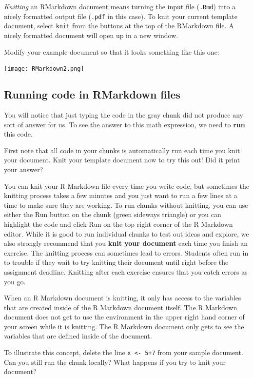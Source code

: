 \documentclass[
]{article}
\makeatletter
\newcommand*\pandocbounded[1]{%
  \sbox\pandoc@box{#1}%
  \Gscale@div\@tempa{\textheight}{\dimexpr\ht\pandoc@box+\dp\pandoc@box\relax}%
  \Gscale@div\@tempb{\linewidth}{\wd\pandoc@box}%
  \ifdim\@tempb\p@<\@tempa\p@\let\@tempa\@tempb\fi%
  \ifdim\@tempa\p@<\p@\scalebox{\@tempa}{\usebox\pandoc@box}%
  \else\usebox{\pandoc@box}%
  \fi%
}
\makeatother
\begin{document}
\emph{Knitting} an RMarkdown document means turning the input file
(\texttt{.Rmd}) into a nicely formatted output file (\texttt{.pdf} in
this case). To knit your current template document, select \texttt{knit}
from the buttons at the top of the RMarkdown file. A nicely formatted
document will open up in a new window.

Modify your example document so that it looks something like this one:

\texttt{[image: RMarkdown2.png]}

\subsection{Running code in RMarkdown
files}\label{running-code-in-rmarkdown-files}

You will notice that just typing the code in the gray chunk did not
produce any sort of answer for us. To see the answer to this math
expression, we need to \textbf{run} this code.

\pandocbounded{\texttt{[image: example.png]}} First
note that all code in your chunks is automatically run each time you
knit your document. Knit your template document now to try this out! Did
it print your answer?

You can knit your R Markdown file every time you write code, but
sometimes the knitting process takes a few minutes and you just want to
run a few lines at a time to make sure they are working. To run chunks
without knitting, you can use either the Run button on the chunk (green
sideways triangle) or you can highlight the code and click Run on the
top right corner of the R Markdown editor. While it is good to run
individual chunks to test out ideas and explore, we also strongly
recommend that you \textbf{knit your document} each time you finish an
exercise. The knitting process can sometimes lead to errors. Students
often run in to trouble if they wait to try knitting their document
until right before the assignment deadline. Knitting after each exercise
ensures that you catch errors as you go.

When an R Markdown document is knitting, it only has access to the
variables that are created inside of the R Markdown document itself. The
R Markdown document does not get to use the environment in the upper
right hand corner of your screen while it is knitting. The R Markdown
document only gets to see the variables that are defined inside of the
document.

To illustrate this concept, delete the line
\texttt{x\ \textless{}-\ 5+7} from your sample document. Can you still
run the chunk locally? What happens if you try to knit your document?
\end{document}

